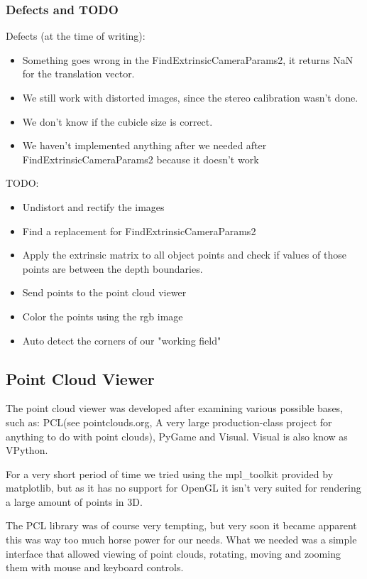 \subsubsection{Defects and TODO}
Defects (at the time of writing):
\begin{itemize}
\item Something goes wrong in the FindExtrinsicCameraParams2, it returns NaN for the translation vector.
\item We still work with distorted images, since the stereo calibration wasn't done.
\item We don't know if the cubicle size is correct.
\item We haven't implemented anything after we needed after FindExtrinsicCameraParams2 because it doesn't work
\end{itemize}
TODO:
\begin{itemize}
\item Undistort and rectify the images
\item Find a replacement for FindExtrinsicCameraParams2
\item Apply the extrinsic matrix to all object points and check if values of those points are between the depth boundaries.
\item Send points to the point cloud viewer
\item Color the points using the rgb image
\item Auto detect the corners of our "working field"
\end{itemize}
\subsection{Point Cloud Viewer}

The point cloud viewer was developed after examining various possible
bases, such as: PCL(see pointclouds.org, A very large production-class project for
anything to do with point clouds), PyGame and Visual. Visual is also know
as VPython.

For a very short period of time we tried using the mpl\_toolkit provided
by matplotlib, but as it has no support for OpenGL it isn't very suited
for rendering a large amount of points in 3D.

The PCL library was of course
very tempting, but very soon it became apparent this was way too much horse
power for our needs. What we needed was a simple interface that allowed viewing
of point clouds, rotating, moving and zooming them with mouse and keyboard
controls.

